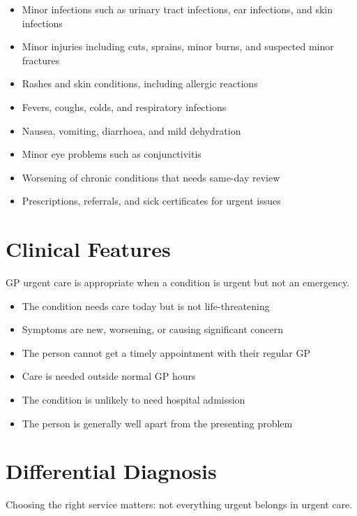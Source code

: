 \begin{itemize}
    \item Minor infections such as urinary tract infections, ear infections, and skin infections
    \item Minor injuries including cuts, sprains, minor burns, and suspected minor fractures
    \item Rashes and skin conditions, including allergic reactions
    \item Fevers, coughs, colds, and respiratory infections
    \item Nausea, vomiting, diarrhoea, and mild dehydration
    \item Minor eye problems such as conjunctivitis
    \item Worsening of chronic conditions that needs same-day review
    \item Prescriptions, referrals, and sick certificates for urgent issues
\end{itemize}

\section*{Clinical Features}
GP urgent care is appropriate when a condition is urgent but not an emergency.

\begin{itemize}
    \item The condition needs care today but is not life-threatening
    \item Symptoms are new, worsening, or causing significant concern
    \item The person cannot get a timely appointment with their regular GP
    \item Care is needed outside normal GP hours
    \item The condition is unlikely to need hospital admission
    \item The person is generally well apart from the presenting problem
\end{itemize}

\section*{Differential Diagnosis}
Choosing the right service matters: not everything urgent belongs in urgent care.


